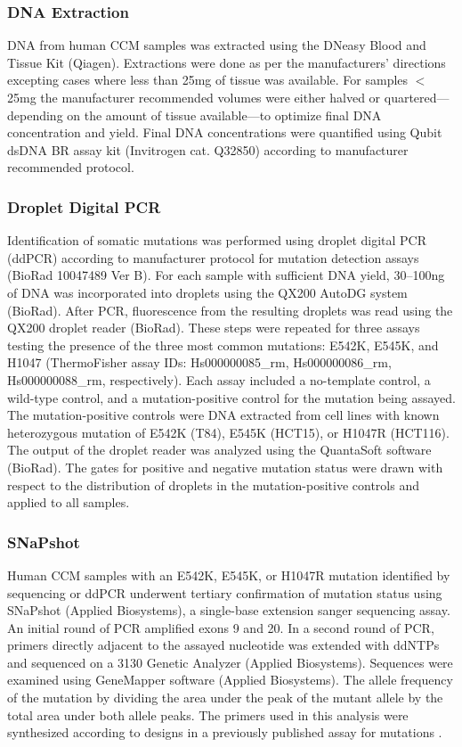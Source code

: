 \subsubsection{DNA Extraction}
DNA from human CCM samples was extracted using the DNeasy Blood and Tissue Kit (Qiagen). Extractions were done as per the manufacturers’ directions excepting cases where less than 25mg of tissue was available. For samples $<$25mg the manufacturer recommended volumes were either halved or quartered---depending on the amount of tissue available---to optimize final DNA concentration and yield. Final DNA concentrations were quantified using Qubit dsDNA BR assay kit (Invitrogen cat. Q32850) according to manufacturer recommended protocol. 

\subsubsection{Droplet Digital PCR}
Identification of somatic  mutations was performed using droplet digital PCR (ddPCR) according to manufacturer protocol for mutation detection assays (BioRad 10047489 Ver B). For each sample with sufficient DNA yield, 30--100ng of DNA was incorporated into droplets using the QX200 AutoDG system (BioRad). After PCR, fluorescence from the resulting droplets was read using the QX200 droplet reader (BioRad). These steps were repeated for three assays testing the presence of the three most common  mutations: E542K, E545K, and H1047 (ThermoFisher assay IDs: Hs000000085\_rm, Hs000000086\_rm, Hs000000088\_rm, respectively). Each assay included a no-template control, a wild-type control, and a mutation-positive control for the mutation being assayed. The mutation-positive controls were DNA extracted from cell lines with known heterozygous mutation of E542K (T84), E545K (HCT15), or H1047R (HCT116).  The output of the droplet reader was analyzed using the QuantaSoft software (BioRad). The gates for positive and negative mutation status were drawn with respect to the distribution of droplets in the mutation-positive controls and applied to all samples. 

\subsubsection{SNaPshot}
Human CCM samples with an E542K, E545K, or H1047R  mutation identified by sequencing or ddPCR underwent tertiary confirmation of mutation status using SNaPshot (Applied Biosystems), a single-base extension sanger sequencing assay. An initial round of PCR amplified exons 9 and 20. In a second round of PCR, primers directly adjacent to the assayed nucleotide was extended with ddNTPs and sequenced on a 3130 Genetic Analyzer (Applied Biosystems). Sequences were examined using GeneMapper software (Applied Biosystems). The allele frequency of the mutation by dividing the area under the peak of the mutant allele by the total area under both allele peaks. The primers used in this analysis were synthesized according to designs in a previously published assay for  mutations \citep{hurst2009}.

